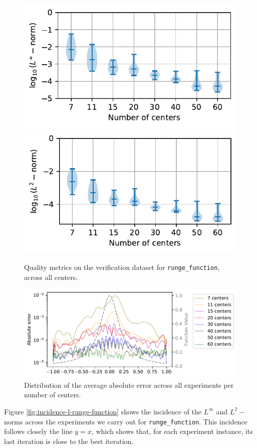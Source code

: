 \documentclass[12pt]{report} %
\begin{document}
\begin{figure}
  \includegraphics[width=.45\textwidth]{imagenes/experiments/1d/statistical_1d_full_scheduler_interpolation/runge_function/violins_linf_runge_function_endgame_2.pdf}
  \includegraphics[width=.45\textwidth]{imagenes/experiments/1d/statistical_1d_full_scheduler_interpolation/runge_function/violins_l2_runge_function_endgame.pdf}
  \caption{Quality metrics on the verification dataset for \texttt{runge\_function}, across all centers.}
  \label{fig:violins-l-runge}
\end{figure}

\begin{figure}
  \includegraphics[width=\textwidth]{imagenes/experiments/1d/statistical_1d_full_scheduler_interpolation/runge_function/runge_function_avg_error.pdf}
  \caption{Distribution of the average absolute error across all experiments per number of centers.}
  \label{fig:distribution-avg-absolute-error-runge}
\end{figure}

Figure \ref{fig:incidence-l-runge-function} shows the incidence of the $L^\infty$ and $L^2-$norms across the experiments we carry out for \texttt{runge\_function}. This incidence follows closely the line $y=x$, which shows that, for each experiment instance, its last iteration is close to the best iteration.
\end{document}
